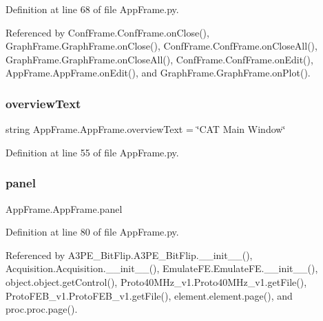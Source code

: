 Definition at line 68 of file App\+Frame.\+py.



Referenced by Conf\+Frame.\+Conf\+Frame.\+on\+Close(), Graph\+Frame.\+Graph\+Frame.\+on\+Close(), Conf\+Frame.\+Conf\+Frame.\+on\+Close\+All(), Graph\+Frame.\+Graph\+Frame.\+on\+Close\+All(), Conf\+Frame.\+Conf\+Frame.\+on\+Edit(), App\+Frame.\+App\+Frame.\+on\+Edit(), and Graph\+Frame.\+Graph\+Frame.\+on\+Plot().

\mbox{\label{classAppFrame_1_1AppFrame_a4434bdbbdbfdeacb2eaef8fa719140fc}} 
\subsubsection{\texorpdfstring{overview\+Text}{overviewText}}
{\footnotesize\ttfamily string App\+Frame.\+App\+Frame.\+overview\+Text = \char`\"{}C\+AT Main Window\char`\"{}\hspace{0.3cm}{\ttfamily [static]}}



Definition at line 55 of file App\+Frame.\+py.

\mbox{\label{classAppFrame_1_1AppFrame_a9d23e592792f8dc28aef712b77d44bad}} 
\subsubsection{\texorpdfstring{panel}{panel}}
{\footnotesize\ttfamily App\+Frame.\+App\+Frame.\+panel}



Definition at line 80 of file App\+Frame.\+py.



Referenced by A3\+P\+E\+\_\+\+Bit\+Flip.\+A3\+P\+E\+\_\+\+Bit\+Flip.\+\_\+\+\_\+init\+\_\+\+\_\+(), Acquisition.\+Acquisition.\+\_\+\+\_\+init\+\_\+\+\_\+(), Emulate\+F\+E.\+Emulate\+F\+E.\+\_\+\+\_\+init\+\_\+\+\_\+(), object.\+object.\+get\+Control(), Proto40\+M\+Hz\+\_\+v1.\+Proto40\+M\+Hz\+\_\+v1.\+get\+File(), Proto\+F\+E\+B\+\_\+v1.\+Proto\+F\+E\+B\+\_\+v1.\+get\+File(), element.\+element.\+page(), and proc.\+proc.\+page().

